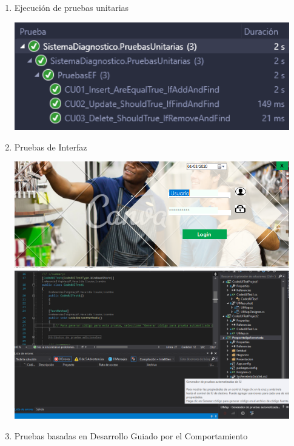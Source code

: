 \documentclass[preprint,12pt]{elsarticle}
\begin{document}
\begin{enumerate}
\item Ejecución de pruebas unitarias

\begin{center}
	\includegraphics[width=12cm]{./imagen/Screenshot_2.png}
	\end{center}

\item  Pruebas de Interfaz 

\begin{center}
	\includegraphics[width=12cm]{./imagen/interface} 
\includegraphics[width=12cm]{./imagen/f} 
	\end{center}

\item Pruebas basadas en Desarrollo Guiado por el Comportamiento
\end{enumerate}
\end{document}
